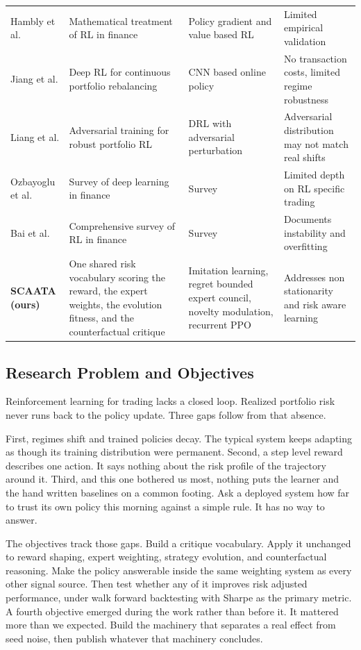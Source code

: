 \documentclass[conference]{IEEEtran}
\begin{document}
\begin{table}[t]
\begin{tabular}{p{2.3cm}p{4.3cm}p{2.8cm}p{4.5cm}}
Hambly et al. \cite{hambly2023recent} & Mathematical treatment of RL in finance & Policy gradient and value based RL & Limited empirical validation \\
Jiang et al. \cite{jiang2017deep} & Deep RL for continuous portfolio rebalancing & CNN based online policy & No transaction costs, limited regime robustness \\
Liang et al. \cite{liang2018adversarial} & Adversarial training for robust portfolio RL & DRL with adversarial perturbation & Adversarial distribution may not match real shifts \\
Ozbayoglu et al. \cite{ozbayoglu2020survey} & Survey of deep learning in finance & Survey & Limited depth on RL specific trading \\
Bai et al. \cite{bai2024survey} & Comprehensive survey of RL in finance & Survey & Documents instability and overfitting \\
\textbf{SCAATA (ours)} & One shared risk vocabulary scoring the reward, the expert weights, the evolution fitness, and the counterfactual critique & Imitation learning, regret bounded expert council, novelty modulation, recurrent PPO & Addresses non stationarity and risk aware learning \\
\bottomrule
\end{tabular}
\end{table}

\subsection{Research Problem and Objectives}

Reinforcement learning for trading lacks a closed loop. Realized portfolio risk never runs back to the policy update. Three gaps follow from that absence.

First, regimes shift and trained policies decay. The typical system keeps adapting as though its training distribution were permanent. Second, a step level reward describes one action. It says nothing about the risk profile of the trajectory around it. Third, and this one bothered us most, nothing puts the learner and the hand written baselines on a common footing. Ask a deployed system how far to trust its own policy this morning against a simple rule. It has no way to answer.

The objectives track those gaps. Build a critique vocabulary. Apply it unchanged to reward shaping, expert weighting, strategy evolution, and counterfactual reasoning. Make the policy answerable inside the same weighting system as every other signal source. Then test whether any of it improves risk adjusted performance, under walk forward backtesting with Sharpe as the primary metric. A fourth objective emerged during the work rather than before it. It mattered more than we expected. Build the machinery that separates a real effect from seed noise, then publish whatever that machinery concludes.
\end{document}
